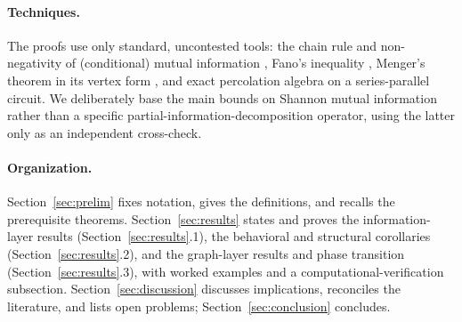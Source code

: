 \paragraph{Techniques.}
The proofs use only standard, uncontested tools: the chain rule and non-negativity of
(conditional) mutual information \cite{cover2006elements}, Fano's inequality
\cite{cover2006elements}, Menger's theorem in its vertex form \cite{diestel2017graph},
and exact percolation algebra on a series-parallel circuit. We deliberately base the
main bounds on Shannon mutual information rather than a specific partial-information-decomposition
operator, using the latter \cite{williams2010pid} only as an independent cross-check.

\paragraph{Organization.}
Section~\ref{sec:prelim} fixes notation, gives the definitions, and recalls the
prerequisite theorems. Section~\ref{sec:results} states and proves the information-layer
results (Section~\ref{sec:results}.1), the behavioral and structural corollaries
(Section~\ref{sec:results}.2), and the graph-layer results and phase transition
(Section~\ref{sec:results}.3), with worked examples and a computational-verification
subsection. Section~\ref{sec:discussion} discusses implications, reconciles the
literature, and lists open problems; Section~\ref{sec:conclusion} concludes.
